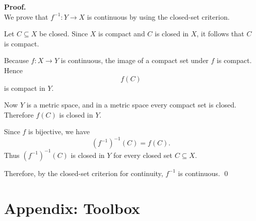 \documentclass[12pt]{article}
\newtheorem{theorem}{Theorem}
\newtheorem{definition}{Definition}
\begin{document}
\textbf{Proof.}\\
We prove that $f^{-1}:Y\to X$ is continuous by using the closed-set criterion.

Let $C\subseteq X$ be closed. Since $X$ is compact and $C$ is closed in $X$, it follows that $C$ is compact.

Because $f:X\to Y$ is continuous, the image of a compact set under $f$ is compact. Hence
\[
f(C)
\]
is compact in $Y$.

Now $Y$ is a metric space, and in a metric space every compact set is closed. Therefore $f(C)$ is closed in $Y$.

Since $f$ is bijective, we have
\[
(f^{-1})^{-1}(C)=f(C).
\]
Thus $(f^{-1})^{-1}(C)$ is closed in $Y$ for every closed set $C\subseteq X$.

Therefore, by the closed-set criterion for continuity, $f^{-1}$ is continuous.
\qed

\newpage
\appendix
\section*{Appendix: Toolbox}

%
\end{document}
